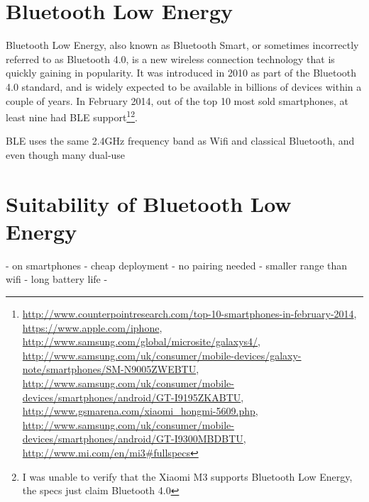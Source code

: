 \section{Bluetooth Low Energy}
Bluetooth Low Energy, also known as Bluetooth Smart, or sometimes incorrectly referred to as Bluetooth 4.0, is a new wireless connection technology that is quickly gaining in popularity.
It was introduced in 2010 as part of the Bluetooth 4.0 standard, and is widely expected to be available in billions of devices within a couple of years.
In February 2014, out of the top 10 most sold smartphones, at least nine had BLE support\footnote{
    \url{http://www.counterpointresearch.com/top-10-smartphones-in-february-2014},
    \url{https://www.apple.com/iphone},
    \url{http://www.samsung.com/global/microsite/galaxys4/},
    \url{http://www.samsung.com/uk/consumer/mobile-devices/galaxy-note/smartphones/SM-N9005ZWEBTU},
    \url{http://www.samsung.com/uk/consumer/mobile-devices/smartphones/android/GT-I9195ZKABTU},
    \url{http://www.gsmarena.com/xiaomi_hongmi-5609.php},
    \url{http://www.samsung.com/uk/consumer/mobile-devices/smartphones/android/GT-I9300MBDBTU},
    \url{http://www.mi.com/en/mi3#fullspecs}
}\footnote{I was unable to verify that the Xiaomi M3 supports Bluetooth Low Energy, the specs just claim Bluetooth 4.0}.


BLE uses the same 2.4GHz frequency band as Wifi and classical Bluetooth, and even though many dual-use 

\section{Suitability of Bluetooth Low Energy}
- on smartphones
- cheap deployment
- no pairing needed
- smaller range than wifi
- long battery life
- 

